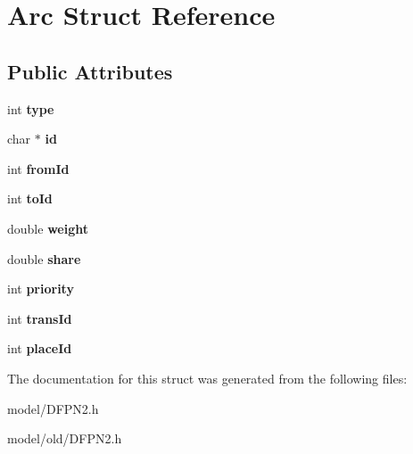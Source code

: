 \hypertarget{structArc}{\section{Arc Struct Reference}
\label{structArc}
}
\subsection*{Public Attributes}
\begin{DoxyCompactItemize}
\item 
\hypertarget{structArc_a38b5c5e6f59aee0edbb3e4e9dcdf8c9d}{int {\bfseries type}}\label{structArc_a38b5c5e6f59aee0edbb3e4e9dcdf8c9d}

\item 
\hypertarget{structArc_adf50e7b02ba35f13b43aba9d5e47777c}{char $\ast$ {\bfseries id}}\label{structArc_adf50e7b02ba35f13b43aba9d5e47777c}

\item 
\hypertarget{structArc_adc4d66f6bb535697e96d138027f92651}{int {\bfseries from\-Id}}\label{structArc_adc4d66f6bb535697e96d138027f92651}

\item 
\hypertarget{structArc_ae421277390b2c7353712922cbe06663d}{int {\bfseries to\-Id}}\label{structArc_ae421277390b2c7353712922cbe06663d}

\item 
\hypertarget{structArc_aa19dfdb1931d6c21730c079711592cf9}{double {\bfseries weight}}\label{structArc_aa19dfdb1931d6c21730c079711592cf9}

\item 
\hypertarget{structArc_aba00cfe2149fe72b3925cd4398a9bc2d}{double {\bfseries share}}\label{structArc_aba00cfe2149fe72b3925cd4398a9bc2d}

\item 
\hypertarget{structArc_a113c9b55b1459477681c4e8f36c2df56}{int {\bfseries priority}}\label{structArc_a113c9b55b1459477681c4e8f36c2df56}

\item 
\hypertarget{structArc_a296eec4d4ed5adb0e239679807e56f8e}{int {\bfseries trans\-Id}}\label{structArc_a296eec4d4ed5adb0e239679807e56f8e}

\item 
\hypertarget{structArc_a045db84eb3c5fffecbd0354f55d03097}{int {\bfseries place\-Id}}\label{structArc_a045db84eb3c5fffecbd0354f55d03097}

\end{DoxyCompactItemize}


The documentation for this struct was generated from the following files\-:\begin{DoxyCompactItemize}
\item 
model/D\-F\-P\-N2.\-h\item 
model/old/D\-F\-P\-N2.\-h\end{DoxyCompactItemize}
